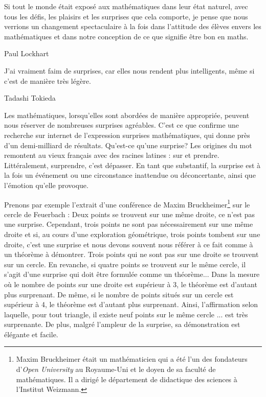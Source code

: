 \epigraph{Si tout le monde était exposé aux mathématiques dans leur état naturel, avec tous les défis, les plaisirs et les surprises que cela comporte, je pense que nous verrions un changement spectaculaire à la fois dans l'attitude des élèves envers les mathématiques et dans notre conception de ce que signifie être \og bon en maths\fg.}{Paul Lockhart}

\vspace{-0.4cm}

\epigraph{J'ai vraiment faim de surprises, car elles nous rendent plus intelligents, même si c'est de manière très légère.}{Tadashi Tokieda}



\medskip

Les mathématiques, lorsqu'elles sont abordées de manière appropriée, peuvent nous réserver de nombreuses surprises agréables. C'est ce que confirme une recherche sur internet de l'expression \og surprises mathématiques\fg, qui donne  près d'un demi-milliard de résultats. Qu'est-ce qu'une surprise? Les origines du mot remontent au vieux français avec des racines latines : \og sur\fg{}  et \og prendre\fg. Littéralement, surprendre, c'est dépasser. En tant que substantif, la surprise est à la fois un événement ou une circonstance inattendue ou déconcertante, ainsi que l'émotion qu'elle provoque.


Prenons par exemple l'extrait d'une conférence de Maxim Bruckheimer\footnote{Maxim Bruckheimer était un mathématicien qui a été l'un des fondateurs d'\emph{Open University} au Royaume-Uni et le doyen de sa faculté de mathématiques. Il a dirigé le département de didactique des sciences à l'Institut Weizmann.} sur le cercle de Feuerbach : \og Deux points se trouvent sur une même  droite, ce n'est pas une surprise. Cependant, trois points ne sont pas nécessairement sur une même droite et si, au cours d'une exploration géométrique, trois points \og tombent\fg{} sur une  droite, c'est une surprise et nous devons souvent nous référer à ce fait comme à un théorème à démontrer. Trois points qui ne sont pas sur une  droite se trouvent sur un cercle. En revanche, si quatre points se trouvent sur le même cercle, il s'agit d'une surprise qui doit être formulée comme un théorème... Dans la mesure où le nombre de points sur une droite est supérieur à 3, le théorème est d'autant plus surprenant. De même, si le nombre de points situés sur un cercle est supérieur à 4, le théorème est d'autant plus surprenant. Ainsi, l'affirmation selon laquelle, pour tout triangle, il existe neuf points  sur le même cercle ... est très surprenante. De plus, malgré l'ampleur de la surprise, sa démonstration est élégante et facile.\fg{}

